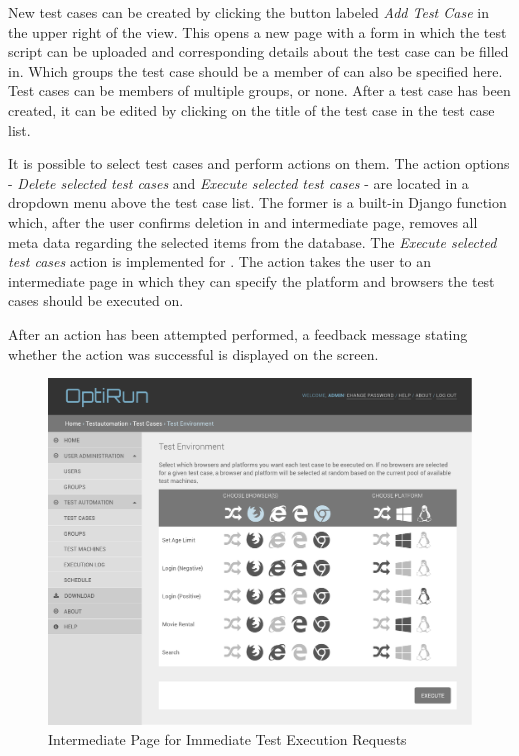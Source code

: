 New test cases can be created by clicking the button labeled \emph{Add Test Case} in the upper right of the view. This opens a new page with a form in which the test script can be uploaded and corresponding details about the test case can be filled in. Which groups the test case should be a member of can also be specified here. Test cases can be members of multiple groups, or none. After a test case has been created, it can be edited by clicking on the title of the test case in the test case list.

It is possible to select test cases and perform actions on them. The action options - \emph{Delete selected test cases} and \emph{Execute selected test cases} - are located in a dropdown menu above the test case list. The former is a built-in Django function which, after the user confirms deletion in and intermediate page, removes all meta data regarding the selected items from the database. The \emph{Execute selected test cases} action is implemented for \toolname. The action takes the user to an intermediate page in which they can specify the platform and browsers the test cases should be executed on.

After an action has been attempted performed, a feedback message stating whether the action was successful is displayed on the screen.


\begin{figure}[h]
    \centering
    \includegraphics[width=\textwidth]{figures/screenshots/OptiRun_immediate_test_execution_intermediate.pdf}
    \caption{Intermediate Page for Immediate Test Execution Requests}
    \label{fig.tc_intermediate}
\end{figure}

